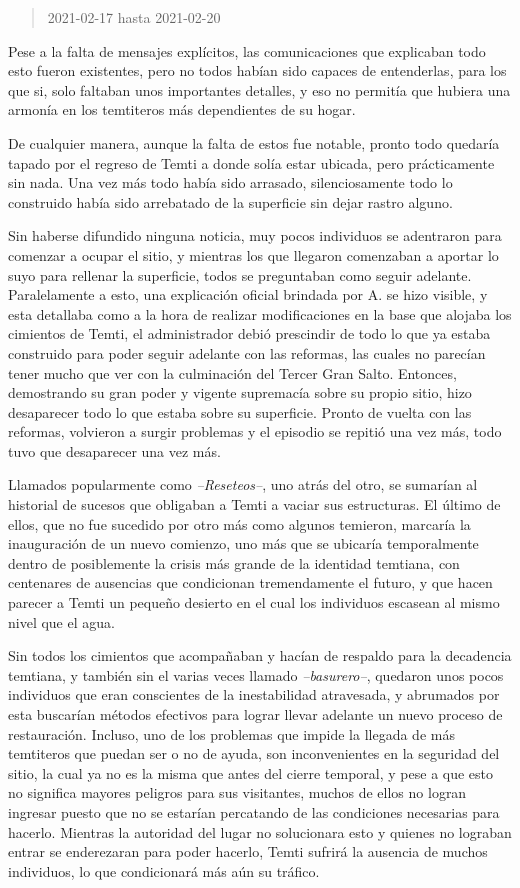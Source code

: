 \documentclass[
  spanish,
]{book}
\begin{document}
\begin{quote}
2021-02-17 hasta 2021-02-20
\end{quote}

Pese a la falta de mensajes explícitos, las comunicaciones que explicaban todo esto fueron existentes, pero no todos habían sido capaces de entenderlas, para los que si, solo faltaban unos importantes detalles, y eso no permitía que hubiera una armonía en los temtiteros más dependientes de su hogar.

De cualquier manera, aunque la falta de estos fue notable, pronto todo quedaría tapado por el regreso de Temti a donde solía estar ubicada, pero prácticamente sin nada. Una vez más todo había sido arrasado, silenciosamente todo lo construido había sido arrebatado de la superficie sin dejar rastro alguno.

Sin haberse difundido ninguna noticia, muy pocos individuos se adentraron para comenzar a ocupar el sitio, y mientras los que llegaron comenzaban a aportar lo suyo para rellenar la superficie, todos se preguntaban como seguir adelante. Paralelamente a esto, una explicación oficial brindada por A. se hizo visible, y esta detallaba como a la hora de realizar modificaciones en la base que alojaba los cimientos de Temti, el administrador debió prescindir de todo lo que ya estaba construido para poder seguir adelante con las reformas, las cuales no parecían tener mucho que ver con la culminación del Tercer Gran Salto. Entonces, demostrando su gran poder y vigente supremacía sobre su propio sitio, hizo desaparecer todo lo que estaba sobre su superficie. Pronto de vuelta con las reformas, volvieron a surgir problemas y el episodio se repitió una vez más, todo tuvo que desaparecer una vez más.

Llamados popularmente como \emph{--Reseteos--}, uno atrás del otro, se sumarían al historial de sucesos que obligaban a Temti a vaciar sus estructuras. El último de ellos, que no fue sucedido por otro más como algunos temieron, marcaría la inauguración de un nuevo comienzo, uno más que se ubicaría temporalmente dentro de posiblemente la crisis más grande de la identidad temtiana, con centenares de ausencias que condicionan tremendamente el futuro, y que hacen parecer a Temti un pequeño desierto en el cual los individuos escasean al mismo nivel que el agua.

Sin todos los cimientos que acompañaban y hacían de respaldo para la decadencia temtiana, y también sin el varias veces llamado \emph{--basurero--}, quedaron unos pocos individuos que eran conscientes de la inestabilidad atravesada, y abrumados por esta buscarían métodos efectivos para lograr llevar adelante un nuevo proceso de restauración. Incluso, uno de los problemas que impide la llegada de más temtiteros que puedan ser o no de ayuda, son inconvenientes en la seguridad del sitio, la cual ya no es la misma que antes del cierre temporal, y pese a que esto no significa mayores peligros para sus visitantes, muchos de ellos no logran ingresar puesto que no se estarían percatando de las condiciones necesarias para hacerlo. Mientras la autoridad del lugar no solucionara esto y quienes no lograban entrar se enderezaran para poder hacerlo, Temti sufrirá la ausencia de muchos individuos, lo que condicionará más aún su tráfico.
\end{document}
